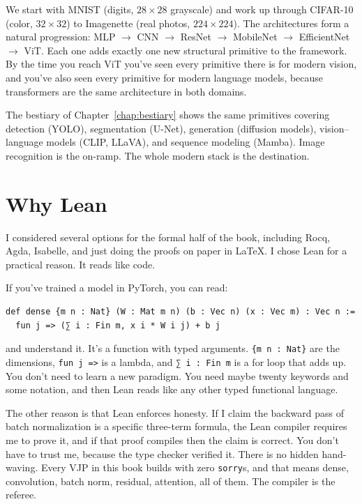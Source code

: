 We start with MNIST (digits, $28 \times 28$ grayscale) and work up
through CIFAR-10 (color, $32 \times 32$) to Imagenette (real photos,
$224 \times 224$). The architectures form a natural progression:
MLP $\to$ CNN $\to$ ResNet $\to$ MobileNet $\to$ EfficientNet $\to$ ViT.
Each one adds exactly one new structural primitive to the framework. By
the time you reach ViT you've seen every primitive there is for modern
vision, and you've also seen every primitive for modern language models,
because transformers are the same architecture in both domains.

The bestiary of Chapter~\ref{chap:bestiary} shows the same primitives
covering detection (YOLO), segmentation (U-Net), generation (diffusion
models), vision--language models (CLIP, LLaVA), and sequence modeling
(Mamba). Image recognition is the on-ramp. The whole
modern stack is the destination.

\section*{Why Lean}

I considered several options for the formal half of the book, including
Rocq, Agda, Isabelle, and just doing the proofs on paper in LaTeX. I
chose Lean for a practical reason. It reads like code.

If you've trained a model in PyTorch, you can read:

\begin{verbatim}
def dense {m n : Nat} (W : Mat m n) (b : Vec n) (x : Vec m) : Vec n :=
  fun j => (∑ i : Fin m, x i * W i j) + b j
\end{verbatim}

and understand it. It's a function with typed arguments.
\texttt{\{m n : Nat\}} are the dimensions, \texttt{fun j =>} is a lambda,
and \texttt{∑ i : Fin m} is a for loop that adds up. You don't need to learn a new
paradigm. You need maybe twenty keywords and some notation, and then Lean
reads like any other typed functional language.

The other reason is that Lean enforces honesty. If I claim the backward
pass of batch normalization is a specific three-term formula, the Lean
compiler requires me to prove it, and if that proof compiles then the
claim is correct. You don't have to trust me, because the type checker
verified it. There is no hidden hand-waving. Every VJP in this book
builds with zero \texttt{sorry}s, and that means dense, convolution,
batch norm, residual, attention, all of them. The compiler is the
referee.

